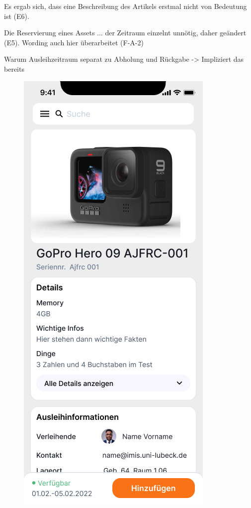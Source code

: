 Es ergab sich, dass eine Beschreibung des Artikels erstmal nicht von Bedeutung ist (E6).

Die Reservierung eines Assets ... der Zeitraum einzelnt unnötig, daher geändert (E5). Wording auch
hier überarbeitet (F-A-2) 

Warum Ausleihzeitraum separat zu Abholung und Rückgabe -> Impliziert das bereits

\begin{figure}[h]
    \centering
    \includegraphics[scale=0.3]{Bilder/Prototyp/Neu/Datailansicht-1.png}

\end{figure}
